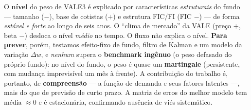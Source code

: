 \documentclass[11pt]{article}
\begin{document}
O \textbf{nível} do peso de VALE3 é explicado por características \emph{estruturais} do
fundo --- tamanho ($-$), base de cotistas ($+$) e estrutura FIC/FI (FIC $-$) --- de
forma \emph{estável e forte} ao longo de seis anos. O ``clima de mercado'' da VALE
(preço $+$, beta $-$) desloca o nível \emph{médio} no tempo. O fluxo não explica o
nível. \textbf{Para prever}, porém, testamos efeito-fixo de fundo, filtro de Kalman e
um modelo da variação $\Delta w$, e \emph{nenhum} supera o \textbf{benchmark ingênuo}
(o peso defasado do próprio fundo): no nível do fundo, o peso é quase um
\textbf{martingale} (persistente, com mudança imprevisível um mês à frente). A
contribuição do trabalho é, portanto, de \textbf{compreensão} --- a função de demanda
e seus fatores latentes ---, mais do que de previsão de curto prazo. A matriz de erros
do melhor modelo tem média $\approx 0$ e é estacionária, confirmando ausência de viés
sistemático.
\end{document}
